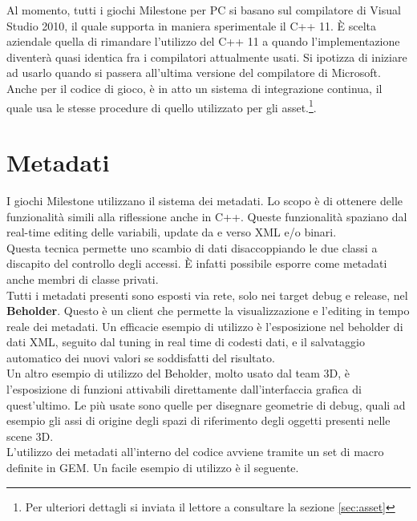 Al momento, tutti i giochi Milestone per PC si basano sul compilatore di Visual Studio 2010, il quale supporta in maniera sperimentale il C++ 11. È scelta aziendale quella di rimandare l'utilizzo del C++ 11 a quando l'implementazione diventerà quasi identica fra i compilatori attualmente usati. Si ipotizza di iniziare ad usarlo quando si passera all'ultima versione del compilatore di Microsoft.\\

Anche per il codice di gioco, è in atto un sistema di integrazione continua, il quale usa le stesse procedure di quello utilizzato per gli asset.\footnote{Per ulteriori dettagli si inviata il lettore a consultare la sezione \ref{sec:asset}}.

\section{Metadati}

I giochi Milestone utilizzano il sistema dei metadati. Lo scopo è di ottenere delle funzionalità simili alla riflessione anche in C++. Queste funzionalità spaziano dal real-time editing delle variabili, update da e verso XML e/o binari.\\

Questa tecnica permette uno scambio di dati disaccoppiando le due classi a discapito del controllo degli accessi. È infatti possibile esporre come metadati anche membri di classe privati.\\

Tutti i metadati presenti sono esposti via rete, solo nei target debug e release, nel \textbf{Beholder}. Questo è un client che permette la visualizzazione e l'editing in tempo reale dei metadati. Un efficacie esempio di utilizzo è l'esposizione nel beholder di dati XML, seguito dal tuning in real time di codesti dati, e il salvataggio automatico dei nuovi valori se soddisfatti del risultato.\\

Un altro esempio di utilizzo del Beholder, molto usato dal team 3D, è l'esposizione di funzioni attivabili direttamente dall'interfaccia grafica di quest'ultimo. Le più usate sono quelle per disegnare geometrie di debug, quali ad esempio gli assi di origine degli spazi di riferimento degli oggetti presenti nelle scene 3D.\\

L'utilizzo dei metadati all'interno del codice avviene tramite un set di macro definite in GEM. Un facile esempio di utilizzo è il seguente.

